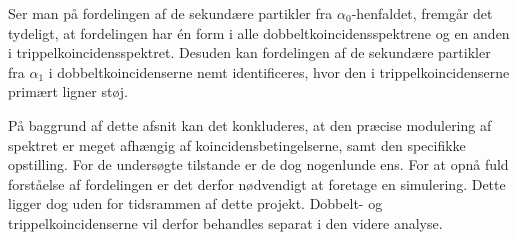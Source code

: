 Ser man på fordelingen af de sekundære partikler fra $\alpha_{0}$-henfaldet, fremgår det tydeligt, at
fordelingen har én form i alle dobbeltkoincidensspektrene og en anden i
trippelkoincidensspektret. Desuden kan fordelingen af de sekundære partikler fra $\alpha_{1}$ i
dobbeltkoincidenserne nemt identificeres, hvor den i trippelkoincidenserne primært ligner støj.

På baggrund af dette afsnit kan det konkluderes, at den præcise modulering af spektret er meget
afhængig af koincidensbetingelserne, samt den specifikke opstilling. For de undersøgte tilstande er
de dog nogenlunde ens. For at opnå fuld forståelse af fordelingen er det
derfor nødvendigt at foretage en simulering. Dette ligger dog uden for tidsrammen af dette
projekt. Dobbelt- og trippelkoincidenserne vil derfor behandles separat i den videre analyse.
